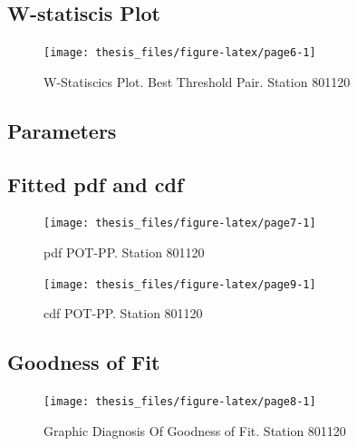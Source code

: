 \documentclass[12pt,oneside]{reedthesis}
\begin{document}
\hypertarget{w-statiscis-plot}{%
\subsection{W-statiscis Plot}\label{w-statiscis-plot}}

\footnotesize
\begin{figure}

{\centering \texttt{[image: thesis\_files/figure-latex/page6-1]} 

}

\caption{W-Statiscics Plot. Best Threshold Pair. Station 801120}\label{fig:page6}
\end{figure}
\normalsize

\hypertarget{parameters}{%
\subsection{Parameters}\label{parameters}}

\hypertarget{fitted-pdf-and-cdf}{%
\subsection{Fitted pdf and cdf}\label{fitted-pdf-and-cdf}}

\footnotesize
\begin{figure}

{\centering \texttt{[image: thesis\_files/figure-latex/page7-1]} 

}

\caption{pdf POT-PP. Station 801120}\label{fig:page7}
\end{figure}
\normalsize

\footnotesize
\begin{figure}

{\centering \texttt{[image: thesis\_files/figure-latex/page9-1]} 

}

\caption{cdf POT-PP. Station 801120}\label{fig:page9}
\end{figure}
\normalsize

\hypertarget{goodness-of-fit}{%
\subsection{Goodness of Fit}\label{goodness-of-fit}}

\footnotesize
\begin{figure}

{\centering \texttt{[image: thesis\_files/figure-latex/page8-1]} 

}

\caption{Graphic Diagnosis Of Goodness of Fit. Station 801120}\label{fig:page8}
\end{figure}
\normalsize
\end{document}
